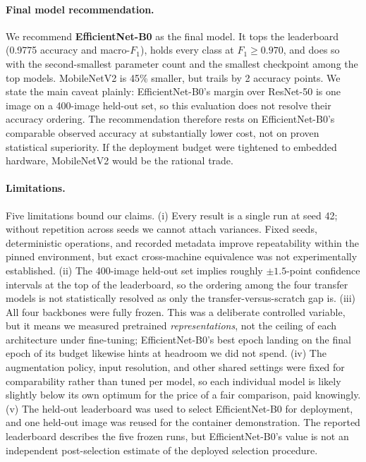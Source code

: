 \documentclass[11pt,twoside,a4paper]{article}
\begin{document}
\paragraph{Final model recommendation.}
We recommend \textbf{EfficientNet-B0} as the final model. It tops the leaderboard
(0.9775 accuracy and macro-$F_1$), holds every class at $F_1 \geq 0.970$,
and does so with the second-smallest parameter count and the smallest
checkpoint among the top models. MobileNetV2 is 45\% smaller, but trails by
2 accuracy points. We state the main caveat plainly: EfficientNet-B0's margin
over ResNet-50 is one image on a 400-image held-out set, so this evaluation does
not resolve their accuracy ordering. The recommendation therefore rests on
EfficientNet-B0's comparable observed accuracy at substantially lower cost,
not on proven statistical superiority. If the deployment budget were
tightened to embedded hardware, MobileNetV2 would be the rational trade.

\paragraph{Limitations.}
Five limitations bound our claims. (i) Every result is a single run at seed
42; without repetition across seeds we cannot attach variances. Fixed seeds,
deterministic operations, and recorded metadata improve repeatability within
the pinned environment, but exact cross-machine equivalence was not
experimentally established. (ii) The
400-image held-out set implies roughly $\pm 1.5$-point confidence intervals at
the top of the leaderboard, so the ordering among the four transfer models is
not statistically resolved as only the transfer-versus-scratch gap is.
(iii) All four backbones were fully frozen. This was a deliberate controlled
variable, but it means we measured pretrained \emph{representations}, not the
ceiling of each architecture under fine-tuning; EfficientNet-B0's best epoch
landing on the final epoch of its budget likewise hints at headroom we did
not spend. (iv) The augmentation policy, input resolution, and other shared
settings were fixed for comparability rather than tuned per model, so each
individual model is likely slightly below its own optimum for the price of a
fair comparison, paid knowingly. (v) The held-out leaderboard was used to
select EfficientNet-B0 for deployment, and one held-out image was reused for
the container demonstration. The reported leaderboard describes the five
frozen runs, but EfficientNet-B0's value is not an independent post-selection
estimate of the deployed selection procedure.
\end{document}
